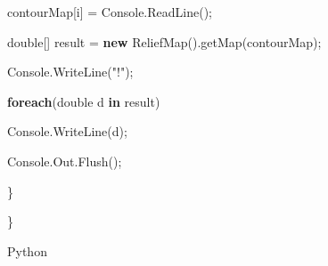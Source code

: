 \documentclass[]{article}
\newenvironment{Shaded}{}{}
\newcommand{\DataTypeTok}[1]{\textcolor[rgb]{0.56,0.13,0.00}{#1}}
\newcommand{\FunctionTok}[1]{\textcolor[rgb]{0.02,0.16,0.49}{#1}}
\newcommand{\KeywordTok}[1]{\textcolor[rgb]{0.00,0.44,0.13}{\textbf{#1}}}
\newcommand{\NormalTok}[1]{#1}
\newcommand{\StringTok}[1]{\textcolor[rgb]{0.25,0.44,0.63}{#1}}
\begin{document}
\begin{Shaded}
\begin{Highlighting}[]
\NormalTok{            contourMap[i] = Console.}\FunctionTok{ReadLine}\NormalTok{();}

        \DataTypeTok{double}\NormalTok{[] result = }\KeywordTok{new} \FunctionTok{ReliefMap}\NormalTok{().}\FunctionTok{getMap}\NormalTok{(contourMap);}

\NormalTok{        Console.}\FunctionTok{WriteLine}\NormalTok{(}\StringTok{"!"}\NormalTok{);}

        \KeywordTok{foreach}\NormalTok{(}\DataTypeTok{double}\NormalTok{ d }\KeywordTok{in}\NormalTok{ result)}

\NormalTok{            Console.}\FunctionTok{WriteLine}\NormalTok{(d);}

\NormalTok{        Console.}\FunctionTok{Out}\NormalTok{.}\FunctionTok{Flush}\NormalTok{();}

\NormalTok{    \}}

\NormalTok{\}}
\end{Highlighting}
\end{Shaded}

Python
\end{document}
